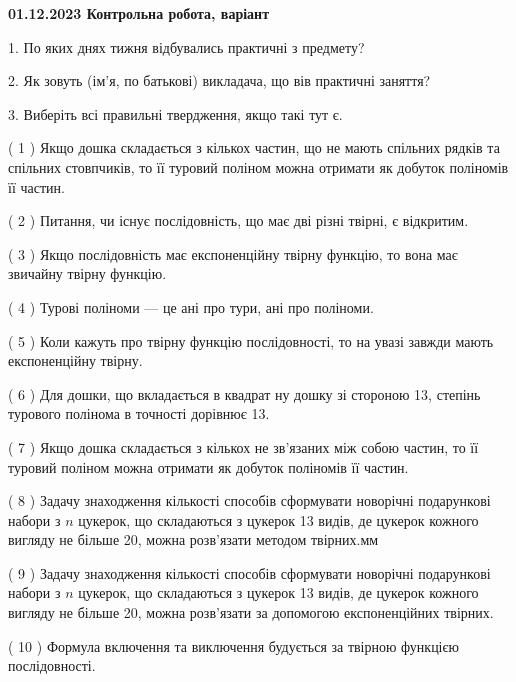 \documentclass[12pt, ukrainian]{article}
\begin{document}
\vspace{4mm}
\newpage
\begin {large}

\textbf{01.12.2023 Контрольна робота, варіант  }\par


{
1. По яких днях тижня відбувались практичні з предмету?



\vspace{5mm}
2. Як зовуть (ім'я, по батькові) викладача, що вів практичні заняття?



\vspace{5mm}
3. Виберіть всі правильні твердження, якщо такі тут є.\par
\vspace{2mm}
( 1 ) Якщо дошка складається з кількох частин, що не мають спільних рядків та спільних стовпчиків, то її туровий поліном можна отримати як добуток поліномів її частин.%

( 2 ) Питання, чи існує послідовність, що має дві різні твірні, є відкритим.%

( 3 ) Якщо послідовність має експоненційну твірну функцію, то вона має звичайну твірну функцію.%

( 4 ) Турові поліноми --- це ані про тури, ані про поліноми.%

( 5 ) Коли кажуть про твірну функцію послідовності, то на увазі завжди мають експоненційну твірну.%

( 6 ) Для дошки, що вкладається в квадрат ну дошку зі стороною 13, степінь турового полінома в точності дорівнює 13.%

( 7 ) Якщо дошка складається з кількох не зв’язаних між собою частин, то її туровий поліном можна отримати як добуток поліномів її частин.%

( 8 ) Задачу знаходження кількості способів сформувати новорічні подарункові набори з $n$ цукерок, що складаються з цукерок 13 видів, де цукерок кожного вигляду не більше 20, можна розв’язати методом твірних.мм%

( 9 ) Задачу знаходження кількості способів сформувати новорічні подарункові набори з $n$ цукерок, що складаються з цукерок 13 видів, де цукерок кожного вигляду не більше 20, можна розв’язати за допомогою експоненційних твірних.%

( 10 ) Формула включення та виключення будується за твірною функцією послідовності.%
}
\end {large}
\end{document}
